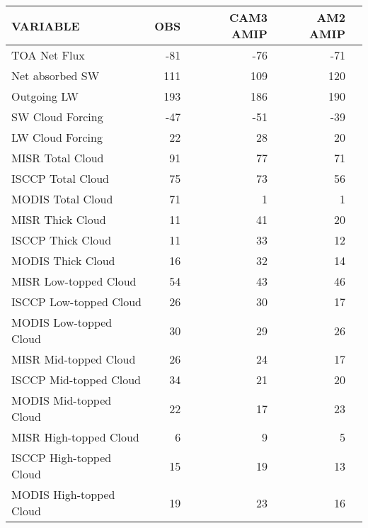 \begin{tabular}{lrrrr}
\hline
                VARIABLE &                      OBS &                CAM3 AMIP &                 AM2 AMIP \\ \hline
            TOA Net Flux &                      -81 &                      -76 &                      -71 \\
         Net absorbed SW &                      111 &                      109 &                      120 \\
             Outgoing LW &                      193 &                      186 &                      190 \\
        SW Cloud Forcing &                      -47 &                      -51 &                      -39 \\
        LW Cloud Forcing &                       22 &                       28 &                       20 \\
        MISR Total Cloud &                       91 &                       77 &                       71 \\
       ISCCP Total Cloud &                       75 &                       73 &                       56 \\
       MODIS Total Cloud &                       71 &                        1 &                        1 \\
        MISR Thick Cloud &                       11 &                       41 &                       20 \\
       ISCCP Thick Cloud &                       11 &                       33 &                       12 \\
       MODIS Thick Cloud &                       16 &                       32 &                       14 \\
   MISR Low-topped Cloud &                       54 &                       43 &                       46 \\
  ISCCP Low-topped Cloud &                       26 &                       30 &                       17 \\
  MODIS Low-topped Cloud &                       30 &                       29 &                       26 \\
   MISR Mid-topped Cloud &                       26 &                       24 &                       17 \\
  ISCCP Mid-topped Cloud &                       34 &                       21 &                       20 \\
  MODIS Mid-topped Cloud &                       22 &                       17 &                       23 \\
  MISR High-topped Cloud &                        6 &                        9 &                        5 \\
 ISCCP High-topped Cloud &                       15 &                       19 &                       13 \\
 MODIS High-topped Cloud &                       19 &                       23 &                       16 \\ \hline
\end{tabular}
